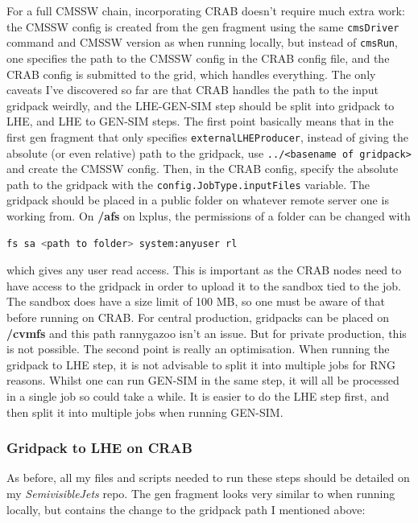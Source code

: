 For a full CMSSW chain, incorporating CRAB doesn't require much extra work: the CMSSW config is created from the gen fragment using the same \texttt{cmsDriver} command and CMSSW version as when running locally, but instead of \texttt{cmsRun}, one specifies the path to the CMSSW config in the CRAB config file, and the CRAB config is submitted to the grid, which handles everything. The only caveats I've discovered so far are that CRAB handles the path to the input gridpack weirdly, and the LHE-GEN-SIM step should be split into gridpack to LHE, and LHE to GEN-SIM steps. The first point basically means that in the first gen fragment that only specifies \texttt{externalLHEProducer}, instead of giving the absolute (or even relative) path to the gridpack, use \texttt{../<basename of gridpack>} and create the CMSSW config. Then, in the CRAB config, specify the absolute path to the gridpack with the \texttt{config.JobType.inputFiles} variable. The gridpack should be placed in a public folder on whatever remote server one is working from. On \textbf{/afs} on lxplus, the permissions of a folder can be changed with

\begin{lstlisting}[belowskip=-0.7cm, language=sh, numbers=none]
fs sa <path to folder> system:anyuser rl
\end{lstlisting}

which gives any user read access. This is important as the CRAB nodes need to have access to the gridpack in order to upload it to the sandbox tied to the job. The sandbox does have a size limit of 100 MB, so one must be aware of that before running on CRAB. For central production, gridpacks can be placed on \textbf{/cvmfs} and this path rannygazoo isn't an issue. But for private production, this is not possible. The second point is really an optimisation. When running the gridpack to LHE step, it is not advisable to split it into multiple jobs for RNG reasons. Whilst one can run GEN-SIM in the same step, it will all be processed in a single job so could take a while. It is easier to do the LHE step first, and then split it into multiple jobs when running GEN-SIM.


\subsubsection{Gridpack to LHE on CRAB}

As before, all my files and scripts needed to run these steps should be detailed on my \emph{SemivisibleJets} repo. The gen fragment looks very similar to when running locally, but contains the change to the gridpack path I mentioned above:

